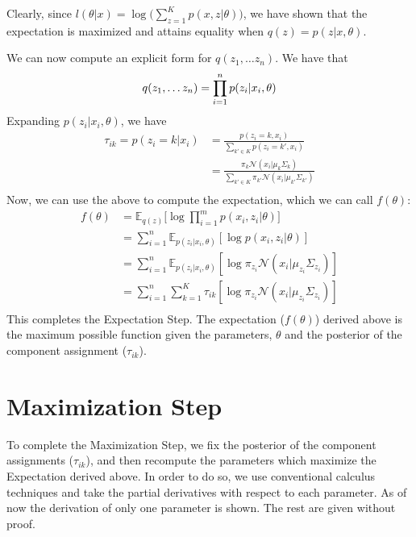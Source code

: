 \documentclass{article}
\begin{document}
Clearly, since $l(\theta | x) = \log \Big(\sum\limits_{z = 1}^{K} p(x, z | \theta) \Big)$, we have shown that the expectation is maximized and attains equality when $q(z) = p(z | x, \theta)$.

We can now compute an explicit form for $q(z_{1}, \ldots z_{n})$. We have that
\begin{equation}
	q(z_{1}, \ldots z_{n}) = \prod\limits_{i = 1}^{n} p(z_{i} | x_{i}, \theta) \\
\end{equation}
Expanding $p(z_{i} | x_{i}, \theta)$, we have
\begin{align*}
	\tau_{ik} = p(z_{i} = k | x_{i})
		&= \frac{p(z_{i} = k, x_{i})}{\sum\limits_{k' \in K} p(z_{i} = k', x_{i})} \\
		&= \frac{\pi_{k} \mathcal{N}(x_{i} | \mu_{k} \Sigma_{k})}{\sum\limits_{k' \in K} \pi_{k'} \mathcal{N}(x_{i} | \mu_{k'} \Sigma_{k'})} \\
\end{align*}
Now, we can use the above to compute the expectation, which we can call $f(\theta)$:
\begin{align*}
	f(\theta)
		&= \mathbb{E}_{q(z)} \Bigg[ \log \prod\limits_{i = 1}^{m} p(x_{i}, z_{i} | \theta) \Bigg] \\
		&= \sum\limits_{i = 1}^{n} \mathbb{E}_{p(z_{i} | x_{i}, \theta)} [\log p(x_{i}, z_{i} | \theta)] \\
		&= \sum\limits_{i = 1}^{n} \mathbb{E}_{p(z_{i} | x_{i}, \theta)} [\log \pi_{z_{i}} \mathcal{N}(x_{i} | \mu_{z_{i}} \Sigma_{z_{i}})] \\
		&= \sum\limits_{i = 1}^{n} \sum\limits_{k = 1}^{K} \tau_{ik} [\log \pi_{z_{i}} \mathcal{N}(x_{i} | \mu_{z_{i}} \Sigma_{z_{i}})] \\
\end{align*}
This completes the Expectation Step. The expectation ($f(\theta)$) derived above is the maximum possible function given the parameters, $\theta$ and the posterior of the component assignment ($\tau_{ik}$).

\section{Maximization Step}
To complete the Maximization Step, we fix the posterior of the component assignments ($\tau_{ik}$), and then recompute the parameters which maximize the Expectation derived above. In order to do so, we use conventional calculus techniques and take the partial derivatives with respect to each parameter. As of now the derivation of only one parameter is shown. The rest are given without proof.
\end{document}
